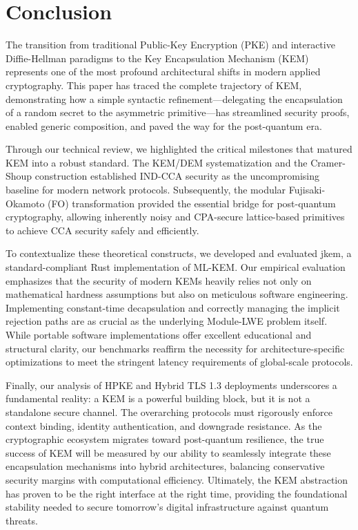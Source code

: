 \chapter{Conclusion}

The transition from traditional Public-Key Encryption (PKE) and interactive Diffie-Hellman paradigms to the Key Encapsulation Mechanism (KEM) represents one of the most profound architectural shifts in modern applied cryptography. This paper has traced the complete trajectory of KEM, demonstrating how a simple syntactic refinement---delegating the encapsulation of a random secret to the asymmetric primitive---has streamlined security proofs, enabled generic composition, and paved the way for the post-quantum era.

Through our technical review, we highlighted the critical milestones that matured KEM into a robust standard. The KEM/DEM systematization and the Cramer-Shoup construction established IND-CCA security as the uncompromising baseline for modern network protocols. Subsequently, the modular Fujisaki-Okamoto (FO) transformation provided the essential bridge for post-quantum cryptography, allowing inherently noisy and CPA-secure lattice-based primitives to achieve CCA security safely and efficiently.

To contextualize these theoretical constructs, we developed and evaluated jkem, a standard-compliant Rust implementation of ML-KEM. Our empirical evaluation emphasizes that the security of modern KEMs heavily relies not only on mathematical hardness assumptions but also on meticulous software engineering. Implementing constant-time decapsulation and correctly managing the implicit rejection paths are as crucial as the underlying Module-LWE problem itself. While portable software implementations offer excellent educational and structural clarity, our benchmarks reaffirm the necessity for architecture-specific optimizations to meet the stringent latency requirements of global-scale protocols.

Finally, our analysis of HPKE and Hybrid TLS 1.3 deployments underscores a fundamental reality: a KEM is a powerful building block, but it is not a standalone secure channel. The overarching protocols must rigorously enforce context binding, identity authentication, and downgrade resistance. As the cryptographic ecosystem migrates toward post-quantum resilience, the true success of KEM will be measured by our ability to seamlessly integrate these encapsulation mechanisms into hybrid architectures, balancing conservative security margins with computational efficiency. Ultimately, the KEM abstraction has proven to be the right interface at the right time, providing the foundational stability needed to secure tomorrow's digital infrastructure against quantum threats.